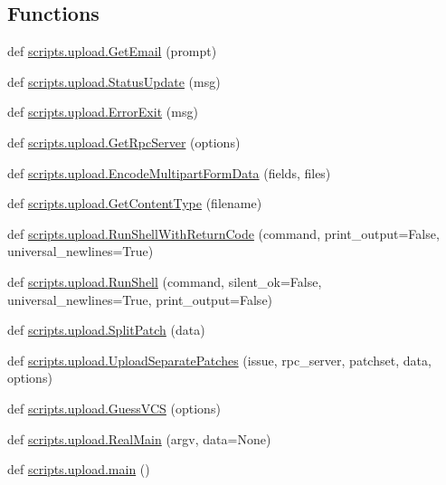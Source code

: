 \subsection*{Functions}
\begin{DoxyCompactItemize}
\item 
def \mbox{\hyperlink{namespacescripts_1_1upload_a6f78509aada94882d886ad10dd22c076}{scripts.\+upload.\+Get\+Email}} (prompt)
\item 
def \mbox{\hyperlink{namespacescripts_1_1upload_a0adebb4560d4a0e086056bef8b616f23}{scripts.\+upload.\+Status\+Update}} (msg)
\item 
def \mbox{\hyperlink{namespacescripts_1_1upload_ab2db40450ce1b1ab568a4efd17e1dff1}{scripts.\+upload.\+Error\+Exit}} (msg)
\item 
def \mbox{\hyperlink{namespacescripts_1_1upload_a488d8bbdefcfcf3b76eed1e4ecc9734d}{scripts.\+upload.\+Get\+Rpc\+Server}} (options)
\item 
def \mbox{\hyperlink{namespacescripts_1_1upload_ac1209f30eb1705e49a49c880a304f741}{scripts.\+upload.\+Encode\+Multipart\+Form\+Data}} (fields, files)
\item 
def \mbox{\hyperlink{namespacescripts_1_1upload_a3f284319cff3bfc3d17c11a14fcd9f83}{scripts.\+upload.\+Get\+Content\+Type}} (filename)
\item 
def \mbox{\hyperlink{namespacescripts_1_1upload_a7d3bf1e9e3525da6086d1e03ea03bea5}{scripts.\+upload.\+Run\+Shell\+With\+Return\+Code}} (command, print\+\_\+output=False, universal\+\_\+newlines=True)
\item 
def \mbox{\hyperlink{namespacescripts_1_1upload_aedb3f0fa371c86c473a04cb68be4e621}{scripts.\+upload.\+Run\+Shell}} (command, silent\+\_\+ok=False, universal\+\_\+newlines=True, print\+\_\+output=False)
\item 
def \mbox{\hyperlink{namespacescripts_1_1upload_aee58569b40f89a2a40ad2a0cf1b2a1d2}{scripts.\+upload.\+Split\+Patch}} (data)
\item 
def \mbox{\hyperlink{namespacescripts_1_1upload_a58d6db5116f3d6ffe2c457b2781f4502}{scripts.\+upload.\+Upload\+Separate\+Patches}} (issue, rpc\+\_\+server, patchset, data, options)
\item 
def \mbox{\hyperlink{namespacescripts_1_1upload_a6534b557ff9297b393beb2ad8c8df888}{scripts.\+upload.\+Guess\+V\+CS}} (options)
\item 
def \mbox{\hyperlink{namespacescripts_1_1upload_a8ed33352d6363488beaf1041faea3fcb}{scripts.\+upload.\+Real\+Main}} (argv, data=None)
\item 
def \mbox{\hyperlink{namespacescripts_1_1upload_a1e4126dfe42af810dcb9da4cbea20a63}{scripts.\+upload.\+main}} ()
\end{DoxyCompactItemize}

